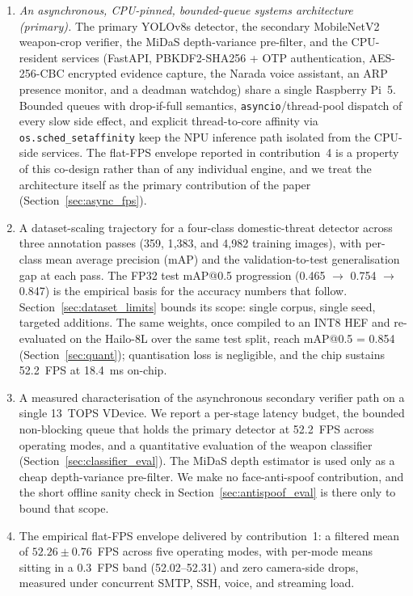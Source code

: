 \documentclass{ieeeaccess}
\begin{document}
\begin{enumerate}
\item \emph{An asynchronous, CPU-pinned, bounded-queue systems architecture (primary).} The primary YOLOv8s detector, the secondary MobileNetV2 weapon-crop verifier, the MiDaS depth-variance pre-filter, and the CPU-resident services (FastAPI, PBKDF2-SHA256 + OTP authentication, AES-256-CBC encrypted evidence capture, the Narada voice assistant, an ARP presence monitor, and a deadman watchdog) share a single Raspberry Pi~5. Bounded queues with drop-if-full semantics, \texttt{asyncio}/thread-pool dispatch of every slow side effect, and explicit thread-to-core affinity via \texttt{os.sched\_setaffinity} keep the NPU inference path isolated from the CPU-side services. The flat-FPS envelope reported in contribution~4 is a property of this co-design rather than of any individual engine, and we treat the architecture itself as the primary contribution of the paper (Section~\ref{sec:async_fps}).
\item A dataset-scaling trajectory for a four-class domestic-threat detector across three annotation passes (359, 1{,}383, and 4{,}982 training images), with per-class mean average precision (mAP) and the validation-to-test generalisation gap at each pass. The FP32 test mAP{@}0.5 progression (0.465 $\rightarrow$ 0.754 $\rightarrow$ 0.847) is the empirical basis for the accuracy numbers that follow. Section~\ref{sec:dataset_limits} bounds its scope: single corpus, single seed, targeted additions. The same weights, once compiled to an INT8 HEF and re-evaluated on the Hailo-8L over the same test split, reach mAP{@}0.5 = 0.854 (Section~\ref{sec:quant}); quantisation loss is negligible, and the chip sustains 52.2~FPS at 18.4~ms on-chip.
\item A measured characterisation of the asynchronous secondary verifier path on a single 13~TOPS VDevice. We report a per-stage latency budget, the bounded non-blocking queue that holds the primary detector at 52.2~FPS across operating modes, and a quantitative evaluation of the weapon classifier (Section~\ref{sec:classifier_eval}). The MiDaS depth estimator is used only as a cheap depth-variance pre-filter. We make no face-anti-spoof contribution, and the short offline sanity check in Section~\ref{sec:antispoof_eval} is there only to bound that scope.
\item The empirical flat-FPS envelope delivered by contribution~1: a filtered mean of $52.26 \pm 0.76$~FPS across five operating modes, with per-mode means sitting in a 0.3~FPS band (52.02--52.31) and zero camera-side drops, measured under concurrent SMTP, SSH, voice, and streaming load.
\end{enumerate}
\end{document}
